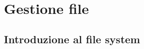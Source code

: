 \documentclass[a4paper]{article}
\begin{document}


\section{Gestione file}
\subsection{Introduzione al file system}
\end{document}
